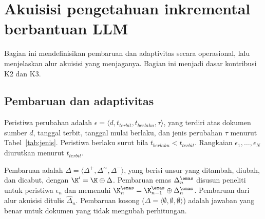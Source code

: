\section{Akuisisi pengetahuan inkremental berbantuan LLM}
\label{sec:akuisisi}

Bagian ini mendefinisikan pembaruan dan adaptivitas secara operasional, lalu menjelaskan alur akuisisi yang menjaganya. Bagian ini menjadi dasar kontribusi K2 dan K3.


\subsection{Pembaruan dan adaptivitas}
\label{subsec:adaptif}

\begin{definisi}
\label{def:peristiwa}
Peristiwa perubahan adalah $\epsilon = \langle d, t_{\mathit{terbit}}, t_{\mathit{berlaku}}, \tau \rangle$, yang terdiri atas dokumen sumber $d$, tanggal terbit, tanggal mulai berlaku, dan jenis perubahan $\tau$ menurut Tabel~\ref{tab:jenis}. Peristiwa berlaku surut bila $t_{\mathit{berlaku}} < t_{\mathit{terbit}}$. Rangkaian $\epsilon_1, \dots, \epsilon_N$ diurutkan menurut $t_{\mathit{terbit}}$.
\end{definisi}

\begin{definisi}[Pembaruan]
\label{def:pembaruan}
Pembaruan adalah $\Delta = \langle \Delta^{+}, \Delta^{\sim}, \Delta^{-} \rangle$, yang berisi unsur yang ditambah, diubah, dan dicabut, dengan $\K' = \K \oplus \Delta$. Pembaruan emas $\Delta^{\emas}_n$ disusun peneliti untuk peristiwa $\epsilon_n$ dan memenuhi $\K^{\emas}_n = \K^{\emas}_{n-1} \oplus \Delta^{\emas}_n$. Pembaruan dari alur akuisisi ditulis $\hat{\Delta}_n$. Pembaruan kosong ($\Delta = \langle \emptyset, \emptyset, \emptyset \rangle$) adalah jawaban yang benar untuk dokumen yang tidak mengubah perhitungan.
\end{definisi}

